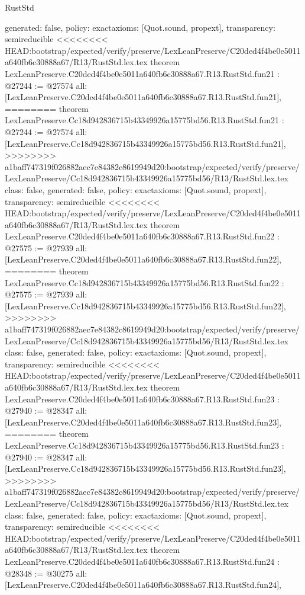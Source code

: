 \begin{lexlean}{RustStd}
\begin{coremodule}
{\begin{coremodule}
{{{{{{{{{{{{{{{{{{{{{{{{  generated: false,
  policy: exact{axioms: [Quot.sound, propext]},
  transparency: semireducible
}
<<<<<<<< HEAD:bootstrap/expected/verify/preserve/LexLeanPreserve/C20ded4f4be0e5011a640fb6c30888a67/R13/RustStd.lex.tex
theorem LexLeanPreserve.C20ded4f4be0e5011a640fb6c30888a67.R13.RustStd.fun21 : @27244 := @27574 {
  all: [LexLeanPreserve.C20ded4f4be0e5011a640fb6c30888a67.R13.RustStd.fun21],
========
theorem LexLeanPreserve.Cc18d942836715b43349926a15775bd56.R13.RustStd.fun21 : @27244 := @27574 {
  all: [LexLeanPreserve.Cc18d942836715b43349926a15775bd56.R13.RustStd.fun21],
>>>>>>>> a1baff747319f026882aec7e84382c8619949d20:bootstrap/expected/verify/preserve/LexLeanPreserve/Cc18d942836715b43349926a15775bd56/R13/RustStd.lex.tex
  class: false,
  generated: false,
  policy: exact{axioms: [Quot.sound, propext]},
  transparency: semireducible
}
<<<<<<<< HEAD:bootstrap/expected/verify/preserve/LexLeanPreserve/C20ded4f4be0e5011a640fb6c30888a67/R13/RustStd.lex.tex
theorem LexLeanPreserve.C20ded4f4be0e5011a640fb6c30888a67.R13.RustStd.fun22 : @27575 := @27939 {
  all: [LexLeanPreserve.C20ded4f4be0e5011a640fb6c30888a67.R13.RustStd.fun22],
========
theorem LexLeanPreserve.Cc18d942836715b43349926a15775bd56.R13.RustStd.fun22 : @27575 := @27939 {
  all: [LexLeanPreserve.Cc18d942836715b43349926a15775bd56.R13.RustStd.fun22],
>>>>>>>> a1baff747319f026882aec7e84382c8619949d20:bootstrap/expected/verify/preserve/LexLeanPreserve/Cc18d942836715b43349926a15775bd56/R13/RustStd.lex.tex
  class: false,
  generated: false,
  policy: exact{axioms: [Quot.sound, propext]},
  transparency: semireducible
}
<<<<<<<< HEAD:bootstrap/expected/verify/preserve/LexLeanPreserve/C20ded4f4be0e5011a640fb6c30888a67/R13/RustStd.lex.tex
theorem LexLeanPreserve.C20ded4f4be0e5011a640fb6c30888a67.R13.RustStd.fun23 : @27940 := @28347 {
  all: [LexLeanPreserve.C20ded4f4be0e5011a640fb6c30888a67.R13.RustStd.fun23],
========
theorem LexLeanPreserve.Cc18d942836715b43349926a15775bd56.R13.RustStd.fun23 : @27940 := @28347 {
  all: [LexLeanPreserve.Cc18d942836715b43349926a15775bd56.R13.RustStd.fun23],
>>>>>>>> a1baff747319f026882aec7e84382c8619949d20:bootstrap/expected/verify/preserve/LexLeanPreserve/Cc18d942836715b43349926a15775bd56/R13/RustStd.lex.tex
  class: false,
  generated: false,
  policy: exact{axioms: [Quot.sound, propext]},
  transparency: semireducible
}
<<<<<<<< HEAD:bootstrap/expected/verify/preserve/LexLeanPreserve/C20ded4f4be0e5011a640fb6c30888a67/R13/RustStd.lex.tex
theorem LexLeanPreserve.C20ded4f4be0e5011a640fb6c30888a67.R13.RustStd.fun24 : @28348 := @30275 {
  all: [LexLeanPreserve.C20ded4f4be0e5011a640fb6c30888a67.R13.RustStd.fun24],
}}}}}}}}}}}}}}}}}}}}}}}}}}}
\end{coremodule}}
\end{coremodule}
\end{lexlean}
